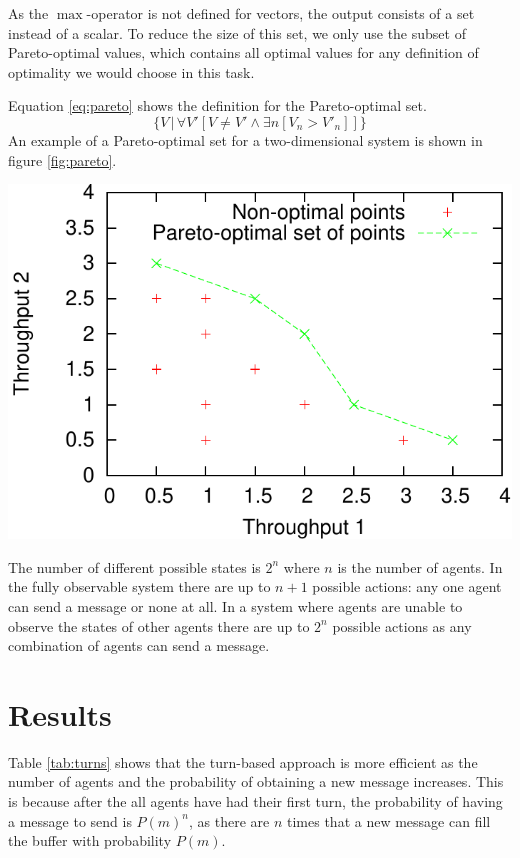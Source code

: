 \documentclass{article}
\makeatletter
\newenvironment{figurehere}
{\def\@captype{figure}}
{}
\makeatother
\begin{document}
\begin{multicols}{2}
		As the $\max$-operator is not defined for vectors, the output consists of
		a set instead of a scalar. To reduce the size of this set, we only use
		the subset of Pareto-optimal values, which contains all optimal values
		for any definition of optimality we would choose in this task.

		Equation \ref{eq:pareto} shows the definition for the Pareto-optimal set.
		\begin{equation}
			\label{eq:pareto}
			\Big\{ V\, \Big| \, \forall V'[ V \neq V' \land \exists n [V_n > V'_n]] \Big\}
		\end{equation}
		An example of a Pareto-optimal set for a two-dimensional system is shown in
		figure \ref{fig:pareto}.

		\begin{figurehere}
			\centering
			\includegraphics[width=\columnwidth]{images/pareto}
			\label{fig:pareto}
		\end{figurehere}

		The number of different possible states is $2^n$ where $n$ is the number
		of agents. In the fully observable system there are up to $n+1$ possible
		actions: any one agent can send a message or none at all. In a system
		where agents are unable to observe the states of other agents there are
		up to $2^n$ possible actions as any combination of agents can send a
		message.


	\section{Results}
	\label{sec:results}
	Table \ref{tab:turns} shows that the turn-based approach is more efficient
	as the number of agents and the probability of obtaining a new message
	increases. This is because after the all agents have had their first turn,
	the probability of having a message to send is $P(m)^n$, as there are
	$n$ times that a new message can fill the buffer with probability $P(m)$.


\end{multicols}
\end{document}
